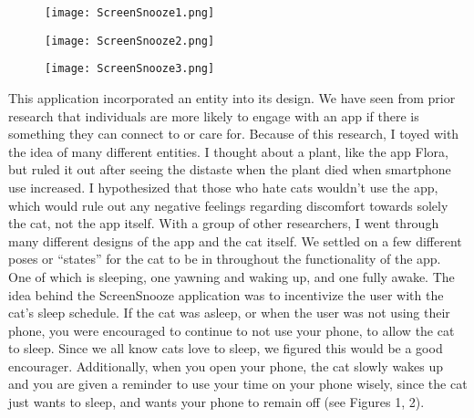 \documentclass[12pt, title page, manuscript, nonacm]{acmart}
\begin{document}
\begin{figure}[b]
  \texttt{[image: ScreenSnooze1.png]}
  \caption{}
\endminipage
\hspace{2cm}
  \texttt{[image: ScreenSnooze2.png]}
  \caption{}
\endminipage
\hspace{2cm}
%
  \texttt{[image: ScreenSnooze3.png]}
  \caption{}
\endminipage
\end{figure}
\par This application incorporated an entity into its design. We have seen from prior research that individuals are more likely to engage with an app if there is something they can connect to or care for\cite{norris2014quantifying}. Because of this research, I toyed with the idea of many different entities. I thought about a plant, like the app Flora, but ruled it out after seeing the distaste when the plant died when smartphone use increased. I hypothesized that those who hate cats wouldn’t use the app, which would rule out any negative feelings regarding discomfort towards solely the cat, not the app itself. With a group of other researchers, I went through many different designs of the app and the cat itself. We settled on a few different poses or “states” for the cat to be in throughout the functionality of the app. One of which is sleeping, one yawning and waking up, and one fully awake. The idea behind the ScreenSnooze application was to incentivize the user with the cat’s sleep schedule. If the cat was asleep, or when the user was not using their phone, you were encouraged to continue to not use your phone, to allow the cat to sleep\cite{gencc2020designing}. Since we all know cats love to sleep, we figured this would be a good encourager. Additionally, when you open your phone, the cat slowly wakes up and you are given a reminder to use your time on your phone wisely, since the cat just wants to sleep, and wants your phone to remain off (see Figures 1, 2). 
\end{document}
